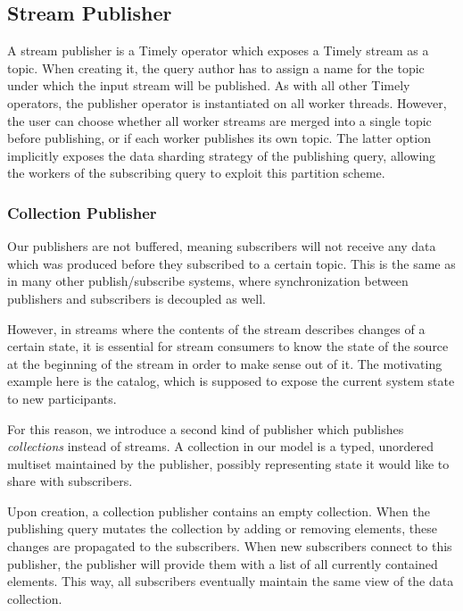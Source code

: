 \clearpage

\subsection{Stream Publisher}

A stream publisher is a Timely operator which exposes a Timely stream as a topic. When
creating it, the query author has to assign a name for the topic under which the
input stream will be published. As with all other Timely operators, the publisher
operator is instantiated on all worker threads. However, the user can choose
whether all worker streams are merged into a single topic before publishing, or
if each worker publishes its own topic. The latter option implicitly exposes
the data sharding strategy of the publishing query, allowing the workers of
the subscribing query to exploit this partition scheme.

\subsubsection{Collection Publisher}

Our publishers are not buffered, meaning subscribers will
not receive any data which was produced before they subscribed to a certain
topic. This is the same as in many other publish/subscribe systems, where
synchronization between publishers and subscribers is decoupled as well. \cite{pubsub}

However, in streams where the contents of the stream describes changes of a certain
state, it is essential for stream consumers to know the state of the source at
the beginning of the stream in order to make sense out of it. The motivating
example here is the catalog, which is supposed to expose the current system state to
new participants.

For this reason, we introduce a second kind of publisher which publishes
\emph{collections} instead of streams. A collection in our model is a typed, unordered
multiset maintained by the publisher, possibly representing state it would
like to share with subscribers.

Upon creation, a collection publisher contains an empty collection.
When the publishing query mutates the collection by adding or removing elements,
these changes are propagated to the subscribers. When new subscribers connect
to this publisher, the publisher will provide them with a list of all currently
contained elements. This way, all subscribers eventually maintain the same view
of the data collection.

